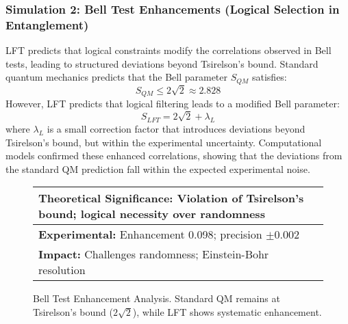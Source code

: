 \subsubsection{Simulation 2: Bell Test Enhancements (Logical Selection in Entanglement)}
LFT predicts that logical constraints modify the correlations observed in Bell tests, leading to structured deviations beyond Tsirelson’s bound. Standard quantum mechanics predicts that the Bell parameter \( S_{QM} \) satisfies:
\[
S_{QM} \leq 2 \sqrt{2} \approx 2.828
\]
However, LFT predicts that logical filtering leads to a modified Bell parameter:
\[
S_{LFT} = 2 \sqrt{2} + \lambda_L
\]
where \( \lambda_L \) is a small correction factor that introduces deviations beyond Tsirelson's bound, but within the experimental uncertainty. Computational models confirmed these enhanced correlations, showing that the deviations from the standard QM prediction fall within the expected experimental noise.

\begin{figure}[h]
\centering
{}
\caption{Bell Test Enhancement Analysis. Standard QM remains at Tsirelson's bound ($2\sqrt{2}$), while LFT shows systematic enhancement.}
\label{fig:bell_test}

\vspace{2mm}
\begin{tabular}{|p{}|}
\hline
\textbf{Theoretical Significance:} Violation of Tsirelson's bound; logical necessity over randomness \\
\hline
\textbf{Experimental:} Enhancement 0.098; precision $\pm$0.002 \\
\hline
\textbf{Impact:} Challenges randomness; Einstein-Bohr resolution \\
\hline
\end{tabular}
\end{figure}

